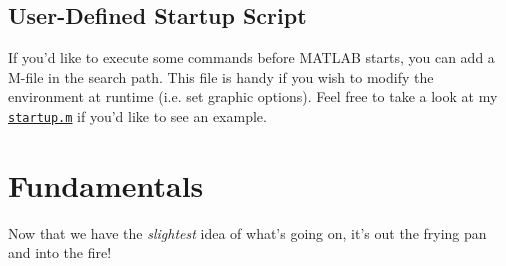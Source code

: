 \documentclass{article}
\begin{document}
\subsection{User-Defined Startup Script}

If you'd like to execute some commands before MATLAB starts, you can add
a  M-file in the search path.  This file is handy if you wish to
modify the environment at runtime (i.e. set graphic options).  Feel free
to take a look at my \href{https://github.com/jacobkoziej/dotfiles/%
blob/master/.config/matlab/startup.m}{\texttt{startup.m}} if you'd like
to see an example.

\section{Fundamentals}

Now that we have the \emph{slightest} idea of what's going on, it's out
the frying pan and into the fire!
\end{document}
